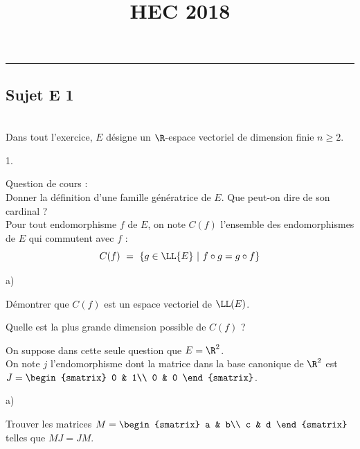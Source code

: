 \documentclass[11pt]{article}%
\title{\bf \vspace{-1.6cm} HEC 2018} %
\author{} %
\date{} %
\begin{document}
\maketitle %
\vspace{-1.2cm}\hrule %
\thispagestyle{fancy}

\vspace*{.2cm}


\subsection*{Sujet E 1}

\begin{exerciceAP}~\\
  Dans tout l'exercice, $E$ désigne un $\R$-espace vectoriel de
  dimension finie $n \geq 2$.
  \begin{noliste}{1.}
  \item Question de cours :\\
    Donner la définition d'une famille génératrice
    de $E$. Que peut-on dire de son cardinal ?\\[.4cm]
    Pour tout endomorphisme $f$ de $E$, on note $C(f)$ l'ensemble des
    endomorphismes de $E$ qui commutent avec $f$ :
    \[
      C(f) \ = \ \{g \in \LL{E} \ | \ f \circ g = 
      g \circ f \}
    \]
    
  \item    
    \begin{noliste}{a)}
    \item Démontrer que $C(f)$ est un espace vectoriel de $\LL(E)$.
      
    \item Quelle est la plus grande dimension possible de $C(f)$ ?
    \end{noliste}
    
  \item On suppose dans cette seule question que $E=\R^2$.\\
    On note $j$ l'endomorphisme dont la matrice dans la base canonique
    de $\R^2$ est $J = 
    \begin{smatrix}
      0 & 1\\
      0 & 0
    \end{smatrix}$.
    \begin{noliste}{a)}
    \item Trouver les matrices $M=
      \begin{smatrix}
        a & b\\
        c & d
      \end{smatrix}$
      telles que $MJ = JM$.
      

\end{noliste}
\end{noliste}
\end{exerciceAP}
\end{document}
